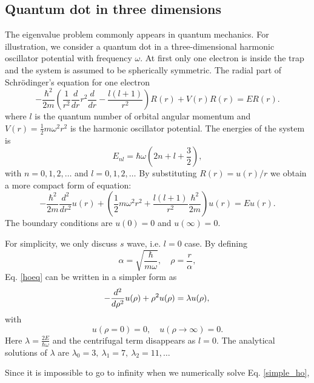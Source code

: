\documentclass{article}
\begin{document}
	\subsection{Quantum dot in three dimensions}\label{quantumdot}
The eigenvalue problem commonly appears in quantum mechanics. 
For illustration, we consider a quantum dot in a three-dimensional harmonic oscillator potential with frequency $\omega$. 
At first only one electron is inside the trap and the system is assumed to be spherically symmetric. 
The radial part of Schr\"{o}dinger's equation for one electron 
\begin{equation}
-\frac{\hbar^2}{2 m} \left ( \frac{1}{r^2} \frac{d}{dr} r^2
\frac{d}{dr} - \frac{l (l + 1)}{r^2} \right )R(r) 
+ V(r) R(r) = E R(r).
\end{equation}
where $l$ is the quantum number of orbital angular momentum and $V(r)=\frac{1}{2}m\omega^2 r^2$ is the harmonic oscillator potential. 
The energies of the system is 
\begin{equation}
E_{nl}=  \hbar \omega \left(2n+l+\frac{3}{2}\right),
\end{equation}
with $n=0,1,2,\dots$ and $l=0,1,2,\dots$
By substituting $R(r) = u(r)/r$ we obtain a more compact form of equation: 
\begin{equation}\label{hoeq}
-\frac{\hbar^2}{2 m} \frac{d^2}{dr^2} u(r) 
+ \left ( \frac{1}{2}m\omega^2 r^2 + \frac{l (l + 1)}{r^2}\frac{\hbar^2}{2 m}
\right ) u(r)  = E u(r) .
\end{equation}
The boundary conditions are $u(0)=0$ and $u(\infty)=0$.
\par
For simplicity, we only discuss $s$ wave, i.e. $l=0$ case. 
By defining 
\begin{equation*}
\alpha=\sqrt{\frac{\hbar}{m\omega}},\quad \rho=\frac{r}{\alpha},
\end{equation*}
Eq. \ref{hoeq} can be written in a simpler form as
\begin{equation}\label{simple_ho}
  -\frac{d^2}{d\rho^2} u(\rho) + \rho^2u(\rho)  = \lambda u(\rho), \\
\end{equation}
with
\begin{equation*}
  u(\rho=0)=0,\quad u(\rho\rightarrow\infty)=0. 
\end{equation*} 
Here $\lambda=\frac{2E}{\hbar\omega}$ and the centrifugal term disappears as $l=0$. 
The analytical solutions of $\lambda$ are $\lambda_0=3,\ \lambda_1=7,\ \lambda_2=11,\dots$
\par
Since it is impossible to go to infinity when we numerically solve Eq. \ref{simple_ho}, 
\end{document}
